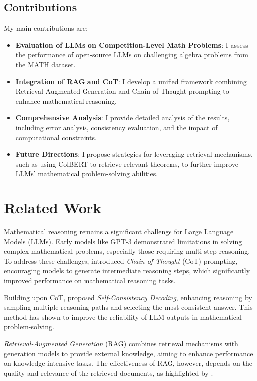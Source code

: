 \documentclass[11pt,a4paper]{article}
\begin{document}
\subsection{Contributions}
My main contributions are:
\begin{itemize}[noitemsep,nolistsep]
    \item \textbf{Evaluation of LLMs on Competition-Level Math Problems}: I assess the performance of open-source LLMs on challenging algebra problems from the MATH dataset.
    \item \textbf{Integration of RAG and CoT}: I develop a unified framework combining Retrieval-Augmented Generation and Chain-of-Thought prompting to enhance mathematical reasoning.
    \item \textbf{Comprehensive Analysis}: I provide detailed analysis of the results, including error analysis, consistency evaluation, and the impact of computational constraints.
    \item \textbf{Future Directions}: I propose strategies for leveraging retrieval mechanisms, such as using ColBERT to retrieve relevant theorems, to further improve LLMs' mathematical problem-solving abilities.
\end{itemize}

\section{Related Work}

Mathematical reasoning remains a significant challenge for Large Language Models (LLMs). Early models like GPT-3 \cite{brown2020language} demonstrated limitations in solving complex mathematical problems, especially those requiring multi-step reasoning. To address these challenges, \citet{wei2023chainofthoughtpromptingelicitsreasoning} introduced \textit{Chain-of-Thought} (CoT) prompting, encouraging models to generate intermediate reasoning steps, which significantly improved performance on mathematical reasoning tasks.

Building upon CoT, \citet{wang2023selfconsistencyimproveschainthought} proposed \textit{Self-Consistency Decoding}, enhancing reasoning by sampling multiple reasoning paths and selecting the most consistent answer. This method has shown to improve the reliability of LLM outputs in mathematical problem-solving.

\textit{Retrieval-Augmented Generation} (RAG) \cite{lewis2021retrievalaugmentedgenerationknowledgeintensivenlp} combines retrieval mechanisms with generation models to provide external knowledge, aiming to enhance performance on knowledge-intensive tasks. The effectiveness of RAG, however, depends on the quality and relevance of the retrieved documents, as highlighted by \citet{khattab2020colbert}.
\end{document}
